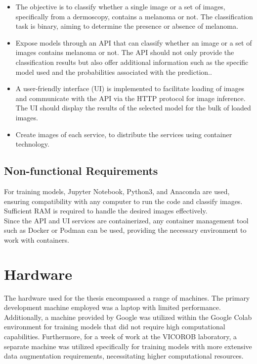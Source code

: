 \begin{itemize} \item The objective is to classify whether a single image or a
      set of images, specifically from a dermoscopy, contains a melanoma or
      not. The classification task is binary, aiming to determine the presence
      or absence of melanoma.

    \item Expose models through an API that can classify whether an image or a
      set of images contains melanoma or not. The API should not only provide
      the classification results but also offer additional information such as
      the specific model used and the probabilities associated with the
      prediction..

    \item A user-friendly interface (UI) is implemented to facilitate loading
      of images and communicate with the API via the HTTP protocol for image
      inference. The UI should display the results of the selected model for
      the bulk of loaded images.

    \item Create images of each service, to distribute the services using container
      technology.
\end{itemize}

\subsection{Non-functional Requirements}

For training models, Jupyter Notebook, Python3, and Anaconda are used, ensuring
compatibility with any computer to run the code and classify images. Sufficient
RAM is required to handle the desired images effectively. \\

Since the API and UI services are containerized, any container management tool
such as Docker or Podman can be used, providing the necessary environment to
work with containers.

\newpage

\section{Hardware}

The hardware used for the thesis encompassed a range of machines. The primary
development machine employed was a laptop with limited performance.
Additionally, a machine provided by Google was utilized within the Google Colab
environment for training models that did not require high computational
capabilities. Furthermore, for a week of work at the VICOROB laboratory, a
separate machine was utilized specifically for training models with more
extensive data augmentation requirements, necessitating higher computational
resources. \\

